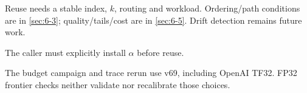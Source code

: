 Reuse needs a stable index, $k$, routing and workload. Ordering/path conditions are in \cref{sec:6-3}; quality/tails/cost are in \cref{sec:6-5}. Drift detection remains future work.

The caller must explicitly install $\alpha$ before reuse.

The budget campaign and trace rerun use v69, including OpenAI TF32. FP32 frontier checks neither validate nor recalibrate those choices.